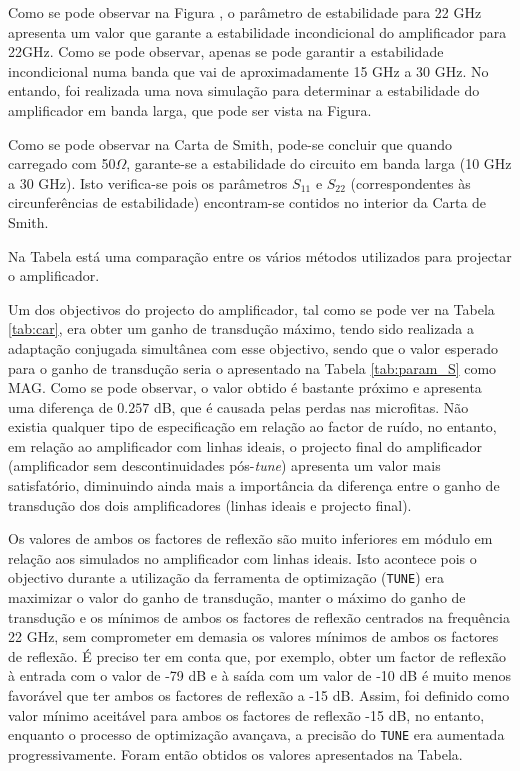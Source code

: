 \documentclass[11pt]{article}
\numberwithin{equation}{section}
\begin{document}
Como se pode observar na Figura , o parâmetro de estabilidade para 22 GHz apresenta um valor que garante a estabilidade incondicional do amplificador para 22GHz. Como se pode observar, apenas se pode garantir a estabilidade incondicional numa banda que vai de aproximadamente 15 GHz a 30 GHz. No entando, foi realizada uma nova simulação para determinar a estabilidade do amplificador em banda larga, que pode ser vista na Figura. 

Como se pode observar na Carta de Smith, pode-se concluir que quando carregado com 50$\Omega$, garante-se a estabilidade do circuito em banda larga (10 GHz a 30 GHz). Isto verifica-se pois os parâmetros $S_{11}$ e $S_{22}$ (correspondentes às circunferências de estabilidade) encontram-se contidos no interior da Carta de Smith.


Na Tabela  está uma comparação entre os vários métodos utilizados para projectar o amplificador.


Um dos objectivos do projecto do amplificador, tal como se pode ver na Tabela \ref{tab:car}, era obter um ganho de transdução máximo, tendo sido realizada a adaptação conjugada simultânea com esse objectivo, sendo que o valor esperado para o ganho de transdução seria o apresentado na Tabela \ref{tab:param_S} como MAG. Como se pode observar, o valor obtido é bastante próximo e apresenta uma diferença de $0.257$ dB, que é causada pelas perdas nas microfitas. Não existia qualquer tipo de especificação em relação ao factor de ruído, no entanto, em relação ao amplificador com linhas ideais, o projecto final do amplificador (amplificador sem descontinuidades pós-\textit{tune}) apresenta um valor mais satisfatório, diminuindo ainda mais a importância da diferença entre o ganho de transdução dos dois amplificadores (linhas ideais e projecto final).

Os valores de ambos os factores de reflexão são muito inferiores em módulo em relação aos simulados no amplificador com linhas ideais. Isto acontece pois o objectivo durante a utilização da ferramenta de optimização (\texttt{TUNE}) era maximizar o valor do ganho de transdução, manter o máximo do ganho de transdução e os mínimos de ambos os factores de reflexão centrados na frequência 22 GHz, sem comprometer em demasia os valores mínimos de ambos os factores de reflexão. É preciso ter em conta que, por exemplo, obter um factor de reflexão à entrada com o valor de -79 dB e à saída com um valor de -10 dB é muito menos favorável que ter ambos os factores de reflexão a -15 dB. Assim, foi definido como valor mínimo aceitável para ambos os factores de reflexão -15 dB, no entanto, enquanto o processo de optimização avançava, a precisão do \texttt{TUNE} era aumentada progressivamente. Foram então obtidos os valores apresentados na Tabela.
\end{document}
